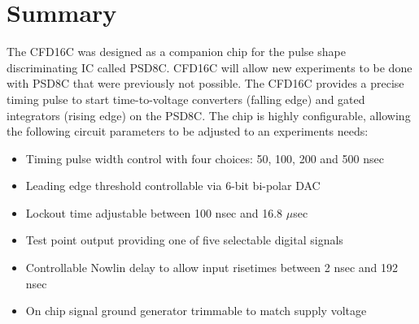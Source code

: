 \documentclass[12pt,oneside,final]{siuethesis}
\theoremstyle{definition}
\begin{document}
\section{Summary}
\par The CFD16C was designed as a companion chip for the pulse shape discriminating IC called PSD8C. CFD16C will allow new experiments to be done with PSD8C that were previously not possible. The CFD16C provides a precise timing pulse to start time-to-voltage converters (falling edge) and gated integrators (rising edge) on the PSD8C. The chip is highly configurable, allowing the following circuit parameters to be adjusted to an experiments needs:

\begin{itemize}
\item Timing pulse width control with four choices: 50, 100, 200 and 500 nsec
\item Leading edge threshold controllable via 6-bit bi-polar DAC
\item Lockout time adjustable between 100 nsec and 16.8 $\mu$sec
\item Test point output providing one of five selectable digital signals
\item Controllable Nowlin delay to allow input risetimes between 2 nsec and 192 nsec
\item On chip signal ground generator trimmable to match supply voltage
\end{itemize}
\end{document}
